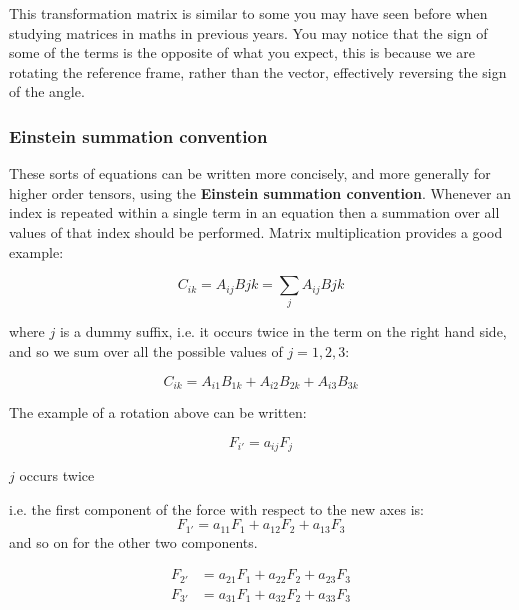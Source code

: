 This transformation matrix is similar to some you may have seen before when studying matrices in maths in previous years. You may notice that the sign of some of the terms is the opposite of what you expect, this is because we are rotating the reference frame, rather than the vector, effectively reversing the sign of the angle.

\subsubsection{Einstein summation convention}

These sorts of equations can be written more concisely, and more generally for higher order tensors, using the {\bf Einstein summation convention}. Whenever an index is repeated within a single term in an equation then a summation over all values of that index should be performed. Matrix multiplication provides a good example:

\begin{equation}
C_{ik} = A_{ij} B{jk} =  \sum_j A_{ij} B{jk} 
\end{equation}

where $j$ is a dummy suffix, i.e. it occurs twice in the term on the right hand side, and so we sum over all the possible values of $j=1,2,3$:

\begin{annotation}
\begin{equation}
C_{ik} = A_{i1}B_{1k} + A_{i2}B_{2k} + A_{i3}B_{3k}
\end{equation}
\end{annotation}


The example of a rotation above can be written:

\begin{equation}
F_{i'} = a_{ij}F_j
\end{equation}
\begin{annotation}
\centering
$j$ occurs twice
\end{annotation}

i.e. the first component of the force with respect to the new axes is:
\begin{equation}
F_{1'} = a_{11}F_1 + a_{12}F_2 + a_{13}F_3
\end{equation}
and so on for the other two components.
\\
\begin{annotation}
\begin{align*}
F_{2'} &= a_{21}F_1 + a_{22}F_2 + a_{23}F_3 \\
F_{3'} &= a_{31}F_1 + a_{32}F_2 + a_{33}F_3
\end{align*}
\end{annotation}
\\

